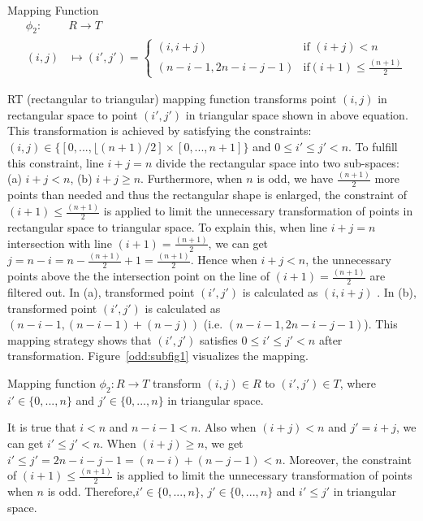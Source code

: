\documentclass[AMA,LATO1COL]{WileyNJD-v2}
\begin{document}
\vspace{5mm}
\begin{definition}
Mapping Function
\begin{eqnarray}
&\phi_2:& R\rightarrow T\\
&(i,j)&\mapsto (i',j')=
  \begin{cases}
   (i,i+j) &\text {if } (i+j) < n \\
   (n-i-1,2n-i-j-1) & \text {if}(i+1) \leq \frac{(n+1)}{2}
  \end{cases}
\end{eqnarray}
\end{definition}
RT (rectangular to triangular) mapping function transforms point $(i,j)$ in rectangular space to point $(i',j')$ in triangular space shown in above equation. This transformation is achieved by satisfying the constraints: $(i,j)\in \{[0,...,\lfloor (n+1)/2] \times [0,...,n+1]\}$ and $0\leq i' \leq j'<n$. To fulfill this constraint, line $i+j=n$ divide the rectangular space into two sub-spaces: (a) $i+j<n$, (b) $i+j\geq n$. Furthermore, when $n$ is odd, we have $\frac{(n+1)}{2}$ more points than needed and thus the rectangular shape is enlarged, the constraint of $(i+1) \leq \frac{(n+1)}{2}$ is applied to limit the unnecessary transformation of points in rectangular space to triangular space. To explain this, when line $i+j=n$ intersection with line $(i+1) = \frac{(n+1)}{2}$, we can get $j=n-i=n-\frac{(n+1)}{2}+1=\frac{(n+1)}{2}$. Hence when $i+j<n$, the unnecessary points above the the intersection point on the line of $(i+1) = \frac{(n+1)}{2}$ are filtered out.  In (a), transformed point $(i',j')$ is calculated as $(i,i+j)$ . In (b), transformed point $(i',j')$ is calculated as $(n-i-1,(n-i-1)+(n-j))$ (i.e. $(n-i-1,2n-i-j-1)$). This mapping strategy shows that $(i',j')$ satisfies $0\leq i' \leq j'<n$ after transformation. Figure~\ref{odd:subfig1} visualizes the mapping.
\vspace{5mm}
\begin{lemma}
Mapping function $\phi_2:   R \rightarrow  T$ transform $(i,j) \in R$ to $(i',j')\in T $, where $i' \in \{0,...,n\}$ and $j' \in \{0,...,n\}$ in triangular space.
\end{lemma}
It is true that $i<n$ and $n-i-1<n$. Also when $(i+j) < n$ and $j'=i+j$, we can get $i'\leq j'<n$. When $(i+j) \geq n$, we get $i'\leq j'=2n-i-j-1=(n-i)+(n-j-1)<n$. Moreover, the constraint of $(i+1) \leq \frac{(n+1)}{2}$ is applied to limit the unnecessary transformation of points when $n$ is odd. Therefore,$i' \in \{0,...,n\}$, $j' \in \{0,...,n\}$ and $i'\leq j'$ in triangular space.
\end{document}
